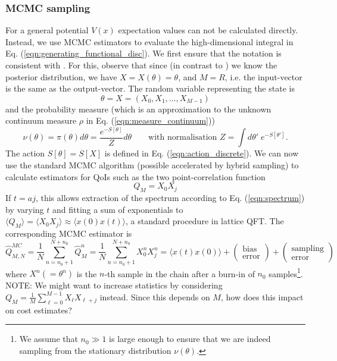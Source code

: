 \documentclass[11pt]{article}
\newcommand{\cblue}[1]{{\color{blue}#1}}
\renewcommand{\vec}[1]{{#1}}
\newcommand{\note}[1]{\cblue{NOTE: #1}}
\begin{document}
\subsubsection{MCMC sampling}
For a general potential $V(x)$ expectation values can not be calculated directly. Instead, we use MCMC estimators to evaluate the high-dimensional integral in Eq. (\ref{eqn:generating_functional_disc}). We first ensure that the notation is consistent with \cite{Dodwell2015}. For this, observe that since (in contrast to \cite{Dodwell2015}) we know the posterior distribution, we have $X=X(\theta)=\theta$, and $M=R$, i.e. the input-vector is the same as the output-vector. The random variable representing the state is
\begin{equation}
  \theta = \vec{X} = (X_0,X_1,\dots,X_{M-1})
\end{equation}
and the probability measure (which is an approximation to the unknown continuum measure $\rho$ in Eq. (\ref{eqn:measure_continuum}))
\begin{equation}
  \nu(\theta) = \pi(\theta)d\theta =\frac{e^{-S[\theta]}}{Z}d\theta\qquad\text{with normalisation $Z=\int d\theta'\; e^{-S[\theta']}$}.
\end{equation}
The action $S[\theta]=S[X]$ is defined in Eq. (\ref{eqn:action_discrete}). We can now use the standard MCMC algorithm (possible accelerated by hybrid sampling) to calculate estimators for QoIs such as the two point-correlation function
\begin{equation}
  Q_M = X_0 X_j
\end{equation}
If $t=aj$, this allows extraction of the spectrum according to Eq. (\ref{eqn:spectrum}) by varying $t$ and fitting a sum of exponentials to $\langle Q_M\rangle = \langle X_0 X_j\rangle\approx\langle x(0)x(t)\rangle$, a standard procedure in lattice QFT.
The corresponding MCMC estimator is
\begin{equation}
  \hat{Q}_{M,N}^{MC} = \frac{1}{N}\sum_{n=n_0+1}^{N+n_0} \hat{Q}_M^n =
  \frac{1}{N} \sum_{n=n_0+1}^{N+n_0} X_0^n X_j^n = \langle x(t) x(0)\rangle + 
\begin{pmatrix}\text{bias}\\\text{error}\end{pmatrix}
+ \begin{pmatrix}\text{sampling}\\\text{error}\end{pmatrix}
\end{equation}
where $X^n (= \theta^n)$ is the $n$-th sample in the chain after a burn-in of $n_0$ samples\footnote{We assume that $n_0\gg 1$ is large enough to ensure that we are indeed sampling from the stationary distribution $\nu(\theta)$.}. \note{We might want to increase statistics by considering $Q_M = \frac{1}{M}\sum_{\ell=0}^{M-1} X_\ell X_{\ell+j}$ instead. Since this depends on $M$, how does this impact on cost estimates?}
\end{document}
